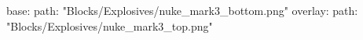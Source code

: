 base:
  path: "Blocks/Explosives/nuke_mark3_bottom.png"
overlay:
  path: "Blocks/Explosives/nuke_mark3_top.png"